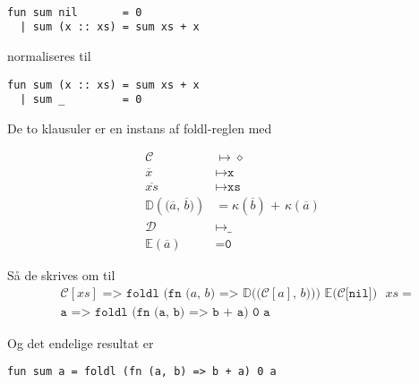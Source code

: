 \begin{example}\
\begin{verbatim}
fun sum nil       = 0
  | sum (x :: xs) = sum xs + x
\end{verbatim}

normaliseres til

\begin{verbatim}
fun sum (x :: xs) = sum xs + x
  | sum _         = 0
\end{verbatim}

De to klausuler er en instans af \textsf{foldl}-reglen med

\begin{align}
  \mathcal{C} &\mapsto \diamond\\
  \overline{x} &\mapsto \texttt{x}\\
  \overline{xs} &\mapsto \texttt{xs}\\
  \mathbb{D}(\texttt{($\overline{a}$, $\overline{b}$)}) &=
  \kappa(\overline{b}) \texttt{ + } \kappa(\overline{a})\\
  \mathcal{D} &\mapsto \texttt{\_}\\
  \mathbb{E}(\overline{a}) &= \texttt{0}
\end{align}

Så de skrives om til
  \begin{align}
    &\texttt{$\mathcal{C}[xs]$ => foldl (fn ($a$, $b$) =>
      $\mathbb{D}($($\mathcal{C}[a]$, $b$)$)$) $\mathbb{E}(\mathcal{C}[$nil$])$ $xs$} =\\
    &\texttt{a => foldl (fn (a, b) => b + a) 0 a}
  \end{align}

Og det endelige resultat er

\begin{verbatim}
fun sum a = foldl (fn (a, b) => b + a) 0 a
\end{verbatim}







\end{example}
